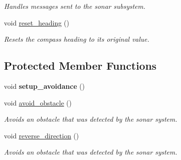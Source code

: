 \begin{DoxyCompactItemize}
\begin{DoxyCompactList}\small\item\em Handles messages sent to the sonar subsystem. \end{DoxyCompactList}\item 
void \hyperlink{classSonar_a9648cfd15b2f2ef88c2094b0dfd19a6c}{reset\-\_\-heading} ()
\begin{DoxyCompactList}\small\item\em Resets the compass heading to its original value. \end{DoxyCompactList}\end{DoxyCompactItemize}
\subsection*{Protected Member Functions}
\begin{DoxyCompactItemize}
\item 
\hypertarget{classSonar_ad40aca152adc93e6a4133b6068d4f2a7}{void {\bfseries setup\-\_\-avoidance} ()}\label{classSonar_ad40aca152adc93e6a4133b6068d4f2a7}

\item 
void \hyperlink{classSonar_a2aa24ef4c9041e0db87db2eab602346d}{avoid\-\_\-obstacle} ()
\begin{DoxyCompactList}\small\item\em Avoids an obstacle that was detected by the sonar system. \end{DoxyCompactList}\item 
void \hyperlink{classSonar_afbda79f1a96e294fb811f03f54a49a46}{reverse\-\_\-direction} ()
\begin{DoxyCompactList}\small\item\em Avoids an obstacle that was detected by the sonar system. \end{DoxyCompactList}\end{DoxyCompactItemize}
